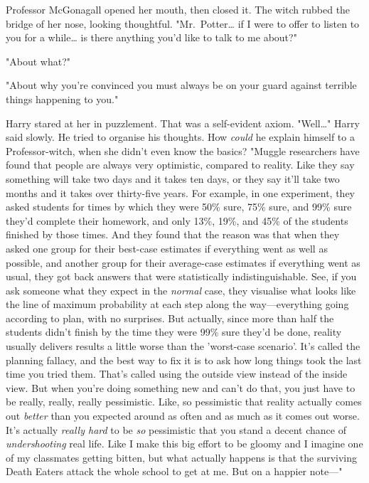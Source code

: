 Professor McGonagall opened her mouth, then closed it. The witch rubbed the 
bridge of her nose, looking thoughtful. "Mr.~Potter{\ldots} if I were to offer 
to listen to you for a while{\ldots} is there anything you'd like to talk to me 
about?"

"About what?"

"About why you're convinced you must always be on your guard against terrible 
things happening to you."

Harry stared at her in puzzlement. That was a self-evident axiom. 
"Well{\ldots}" Harry said slowly. He tried to organise his thoughts. How 
\emph{could} he explain himself to a Professor-witch, when she didn't even know 
the basics? "Muggle researchers have found that people are always very 
optimistic, compared to reality. Like they say something will take two days and 
it takes ten days, or they say it'll take two months and it takes over 
thirty-five years. For example, in one experiment, they asked students for 
times by which they were 50\% sure, 75\% sure, and 99\% sure they'd complete their 
homework, and only 13\%, 19\%, and 45\% of the students finished by those times. 
And they found that the reason was that when they asked one group for their 
best-case estimates if everything went as well as possible, and another group 
for their average-case estimates if everything went as usual, they got back 
answers that were statistically indistinguishable. See, if you ask someone what 
they expect in the \emph{normal} case, they visualise what looks like the line 
of maximum probability at each step along the way---everything going according 
to plan, with no surprises. But actually, since more than half the students 
didn't finish by the time they were 99\% sure they'd be done, reality usually 
delivers results a little worse than the 'worst-case scenario'. It's called the 
planning fallacy, and the best way to fix it is to ask how long things took the 
last time you tried them. That's called using the outside view instead of the 
inside view. But when you're doing something new and can't do that, you just 
have to be really, really, really pessimistic. Like, so pessimistic that 
reality actually comes out \emph{better} than you expected around as often and 
as much as it comes out worse. It's actually \emph{really hard} to be \emph{so} 
pessimistic that you stand a decent chance of \emph{undershooting} real life. 
Like I make this big effort to be gloomy and I imagine one of my classmates 
getting bitten, but what actually happens is that the surviving Death Eaters 
attack the whole school to get at me. But on a happier note---"

